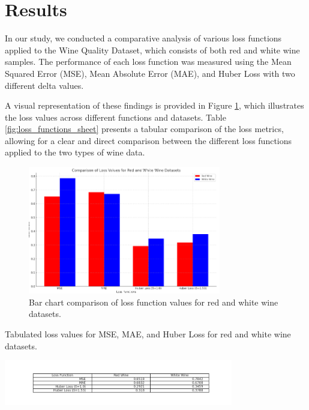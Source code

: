 \documentclass[12pt]{article}
\begin{document}
\section{Results}

In our study, we conducted a comparative analysis of various loss functions applied to the Wine Quality Dataset, which consists of both red and white wine samples. The performance of each loss function was measured using the Mean Squared Error (MSE), Mean Absolute Error (MAE), and Huber Loss with two different delta values.

A visual representation of these findings is provided in Figure \ref{fig:loss_functions_graph}, which illustrates the loss values across different functions and datasets. Table \ref{fig:loss_functions_sheet} presents a tabular comparison of the loss metrics, allowing for a clear and direct comparison between the different loss functions applied to the two types of wine data.

\begin{figure}[H]
    \centering
    \includegraphics[width=0.75\textwidth]{Graph.png}
    \caption{Bar chart comparison of loss function values for red and white wine datasets.}
    \label{fig:loss_functions_graph}
\end{figure}

\begin{table}[H]
    \caption{Tabulated loss values for MSE, MAE, and Huber Loss for red and white wine datasets.}
    \centering
    \includegraphics[width=0.75\textwidth]{Sheet.png}
    \label{fig:loss_functions_sheet}
\end{table}
\end{document}
